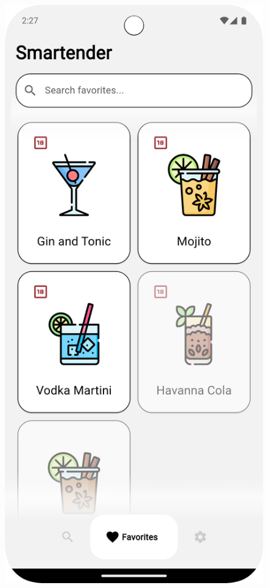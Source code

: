 \begin{figure}[H]
    \centering
    \begin{minipage}{0.27\textwidth}
        \centering
        \includegraphics[width=\textwidth]{graphics/images/favorites_light.png}

\end{minipage}
\end{figure}
